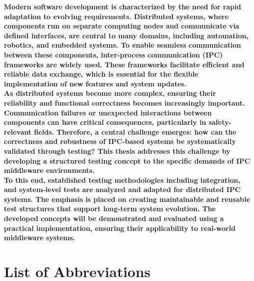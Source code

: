 \documentclass[a4paper,12pt,singlespacing]{article}
\begin{document}
\pagestyle{plain}
\pagebreak
\vspace*{2cm}
\textbf{Modern software development is characterized by the need for rapid adaptation to evolving requirements. Distributed systems, where components run on separate computing nodes and communicate via defined interfaces, are central to many domains, including automation, robotics, and embedded systems. To enable seamless communication between these components, inter-process communication (IPC) frameworks are widely used. These frameworks facilitate efficient and reliable data exchange, which is essential for the flexible implementation of new features and system updates.} \\

\textbf{As distributed systems become more complex, ensuring their reliability and functional correctness becomes increasingly important. Communication failures or unexpected interactions between components can have critical consequences, particularly in safety-relevant fields. Therefore, a central challenge emerges: how can the correctness and robustness of IPC-based systems be systematically validated through testing? This thesis addresses this challenge by developing a structured testing concept to the specific demands of IPC middleware environments.} \\

\textbf{To this end, established testing methodologies including integration, and system-level tests are analyzed and adapted for distributed IPC systems. The emphasis is placed on creating maintainable and reusable test structures that support long-term system evolution. The developed concepts will be demonstrated and evaluated using a practical implementation, ensuring their applicability to real-world middleware systems.}

\pagebreak
\tableofcontents
\pagebreak

\listoffigures
{}
{}
\pagebreak

\renewcommand{\lstlistlistingname}{List of Listings}
\lstlistoflistings
{}
{}
\pagebreak

\section*{List of Abbreviations}
{}
\end{document}
